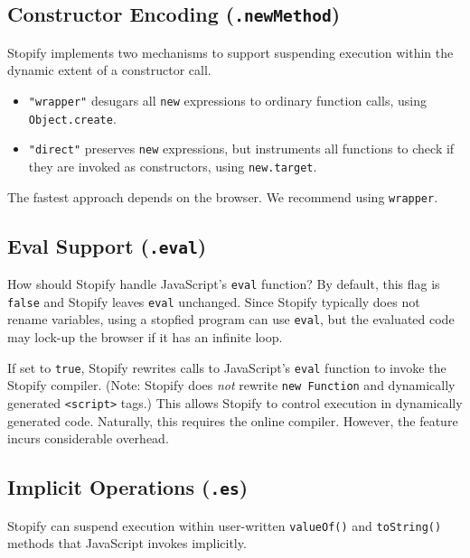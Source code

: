 \documentclass[10pt]{book}
\begin{document}
\subsection{Constructor Encoding (\texttt{.newMethod})\label{new-method}}

Stopify implements two mechanisms to support suspending execution within the
dynamic extent of a constructor call.

\begin{itemize}

\item \lstinline|"wrapper"| desugars all \lstinline|new| expressions to ordinary
function calls, using \lstinline|Object.create|.

\item \lstinline|"direct"| preserves \lstinline|new| expressions,
 but instruments all functions to check if they are invoked as constructors,
 using \lstinline|new.target|.

\end{itemize}

The fastest approach depends on the browser.
We recommend using \lstinline|wrapper|.

\subsection{Eval Support (\texttt{.eval})\label{eval-flag}}

How should Stopify handle JavaScript's \lstinline|eval| function? By default,
this flag is \lstinline|false| and Stopify leaves \lstinline|eval| unchanged.
Since Stopify typically does not rename variables, using a stopfied program can
use \lstinline|eval|, but the evaluated code may lock-up the browser if it has
an infinite loop.

If set to \lstinline|true|, Stopify rewrites calls to JavaScript's
\lstinline|eval| function to invoke the Stopify compiler. (Note: Stopify does
\emph{not} rewrite \lstinline|new Function| and dynamically generated
\texttt{<script>} tags.) This allows Stopify to control execution in
dynamically generated code. Naturally, this requires the online compiler.
However, the feature incurs considerable overhead.


\subsection{Implicit Operations (\texttt{.es})\label{implicit-ops-flag}}

Stopify can suspend execution within user-written \lstinline|valueOf()| and
\lstinline|toString()| methods that JavaScript invokes implicitly.
\end{document}
